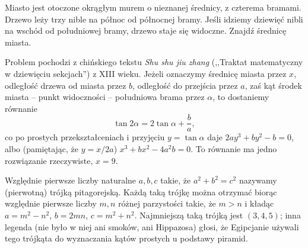 \begin{problem} %
    Miasto jest otoczone okrągłym murem o nieznanej średnicy, z czterema bramami.
    Drzewo leży trzy nible na północ od północnej bramy.
    Jeśli idziemy dziewięć nibli na wschód od południowej bramy, drzewo staje się widoczne. 
    Znajdź średnicę miasta.
\end{problem}

Problem pochodzi z chińskiego tekstu \emph{Shu shu jiu zhang} (,,Traktat matematyczny w dziewięciu sekcjach'') z XIII wieku.
Jeżeli oznaczymy średnicę miasta przez $x$, odległość drzewa od miasta przez $b$, odległość do przejścia przez $a$, zaś kąt środek miasta -- punkt widoczności -- południowa brama przez $\alpha$, to dostaniemy równanie
\begin{equation}
    \tan 2 \alpha = 2 \tan \alpha + \frac ba,
\end{equation}
co po prostych przekształceniach i przyjęciu $y = \tan \alpha$ daje
$
    2ay^3 + by^2 - b = 0
$,
albo (pamiętając, że $y = x/2a$)
$
    x^3 + bx^2 - 4a^2 b = 0
$.
To równanie ma jedno rozwiązanie rzeczywiste, $x = 9$.

Względnie pierwsze liczby naturalne $a, b, c$ takie, że $a^2 + b^2 = c^2$ nazywamy (pierwotną) trójką pitagorejską.
%
Każdą taką trójkę można otrzymać biorąc względnie pierwsze liczby $m, n$ różnej parzystości takie, że $m > n$ i kładąc $a = m^2 - n^2$, $b = 2 mn$, $c = m^2 + n^2$.
Najmniejszą taką trójką jest $(3, 4, 5)$; inna legenda (nie było w niej ani smoków, ani Hippazosa) głosi, że Egipcjanie używali tego trójkąta do wyznaczania kątów prostych u podstawy piramid.

